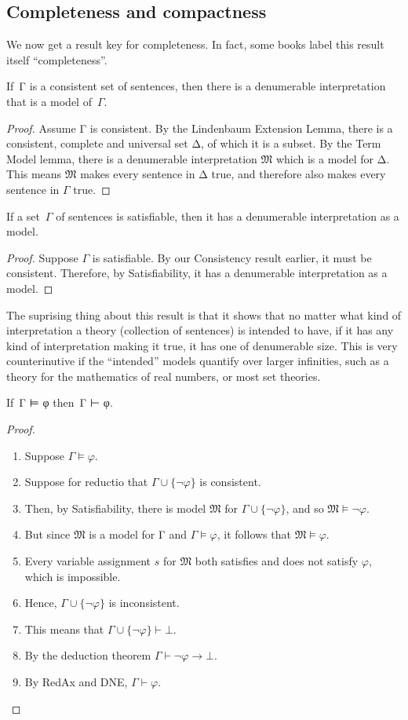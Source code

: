 \documentclass[12pt]{report}
\theoremstyle{nonumberplain}
\newtheorem{proof}{Proof}
\newcommand{\M}{\mathfrak{M}}
\begin{document}
\subsection*{Completeness and compactness}

We now get a result key for completeness. In fact, some books label this result itself ``completeness''.

\begin{mt}[Satisfiability]
If \,Γ is a consistent set of sentences, then there is a denumerable interpretation that is a model of \,$Γ$.
\end{mt}
\begin{proof}
Assume Γ is consistent. By the Lindenbaum Extension Lemma, there is a consistent, complete and universal set Δ, of which it is a subset. By the Term Model lemma, there is a denumerable interpretation $\M$ which is a model for Δ. This means $\M$ makes every sentence in Δ true, and therefore also makes every sentence in $Γ$ true.
\end{proof}

\begin{coro} If a set \,$Γ$ of sentences is satisfiable, then it has a denumerable interpretation as a model.\end{coro}
\begin{proof}
Suppose $Γ$ is satisfiable. By our Consistency result earlier, it must be consistent. Therefore, by Satisfiability, it has a denumerable interpretation as a model.
\end{proof}

\noindent The suprising thing about this result is that it shows that no matter what kind of interpretation a theory (collection of sentences) is intended to have, if it has any kind of interpretation making it true, it has one of denumerable size. This is very counterinutive if the ``intended'' models quantify over larger infinities, such as a theory for the mathematics of real numbers, or most set theories.

\label{completeness}\begin{mt}[Completeness]
If \,Γ ⊨ φ then \,Γ ⊢ φ.
\end{mt}
\begin{proof}
\begin{enumerate}
\item Suppose $Γ ⊨ φ$.
\item Suppose for reductio that $Γ ∪ \{¬φ\}$ is consistent.
\item Then, by Satisfiability, there is model $\M$ for $Γ ∪ \{¬φ\}$, and so $\M ⊨ ¬φ$.
\item But since $\M$ is a model for Γ and $Γ ⊨ φ$, it follows that $\M ⊨ φ$.
\item Every variable assignment $s$ for $\M$ both satisfies and does not satisfy $φ$, which is impossible.
\item Hence, $Γ ∪ \{¬φ\}$ is inconsistent.
\item This means that $Γ ∪ \{¬φ\} ⊢ ⊥$.
\item By the deduction theorem $Γ ⊢ ¬φ → ⊥$.
\item By RedAx and DNE, $Γ ⊢ φ$.
\end{enumerate}
\end{proof}
\end{document}
